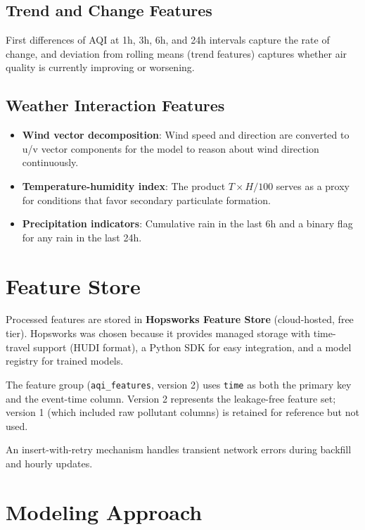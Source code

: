 \documentclass[12pt, a4paper]{article}
\begin{document}
\subsection{Trend and Change Features}

First differences of AQI at 1h, 3h, 6h, and 24h intervals capture the rate of change, and deviation from rolling means (trend features) captures whether air quality is currently improving or worsening.

\subsection{Weather Interaction Features}

\begin{itemize}
  \item \textbf{Wind vector decomposition}: Wind speed and direction are converted to u/v vector components for the model to reason about wind direction continuously.
  \item \textbf{Temperature-humidity index}: The product $T \times H / 100$ serves as a proxy for conditions that favor secondary particulate formation.
  \item \textbf{Precipitation indicators}: Cumulative rain in the last 6h and a binary flag for any rain in the last 24h.
\end{itemize}


\section{Feature Store}

Processed features are stored in \textbf{Hopsworks Feature Store} (cloud-hosted, free tier).  Hopsworks was chosen because it provides managed storage with time-travel support (HUDI format), a Python SDK for easy integration, and a model registry for trained models.

The feature group (\texttt{aqi\_features}, version 2) uses \texttt{time} as both the primary key and the event-time column.  Version 2 represents the leakage-free feature set; version 1 (which included raw pollutant columns) is retained for reference but not used.

An insert-with-retry mechanism handles transient network errors during backfill and hourly updates.


\section{Modeling Approach}
\label{sec:modeling}
\end{document}
